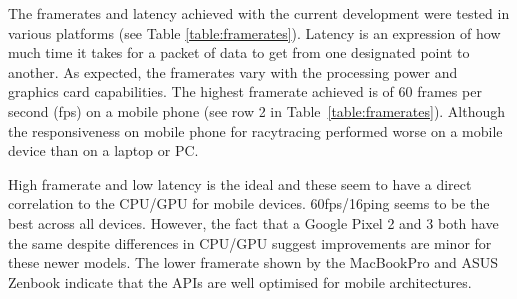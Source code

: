 \documentclass[acmlarge,screen,dvipsnames]{acmart}
\begin{document}

The framerates and latency achieved with the current development were tested
in various platforms (see Table \ref{table:framerates}). Latency is an
expression of how much time it takes for a packet of data to get from one
designated point to another. As expected, the framerates vary with the
processing power and graphics card capabilities. The highest framerate
achieved is of 60 frames per second (fps) on a mobile phone (see row 2 in
Table~\ref{table:framerates}). Although the responsiveness on mobile phone for
racytracing performed worse on a mobile device than on a laptop or PC.

High framerate and low latency is the ideal and these seem to have a direct
correlation to the CPU/GPU for mobile devices. 60fps/16ping seems to be the
best across all devices. However, the fact that a Google Pixel 2 and 3 both
have the same despite differences in CPU/GPU suggest improvements are minor
for these newer models. The lower framerate shown by the MacBookPro
and ASUS Zenbook indicate that the APIs are well optimised for mobile
architectures.

\end{document}
